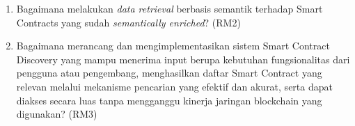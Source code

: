 \begin{enumerate}
	\item Bagaimana melakukan \textit{data retrieval} berbasis semantik terhadap Smart Contracts yang sudah \textit{semantically enriched}? (RM2)

	\item Bagaimana merancang dan mengimplementasikan sistem Smart Contract Discovery yang mampu menerima input berupa kebutuhan fungsionalitas dari pengguna atau pengembang, menghasilkan daftar Smart Contract yang relevan melalui mekanisme pencarian yang efektif dan akurat, serta dapat diakses secara luas tanpa mengganggu kinerja jaringan blockchain yang digunakan? (RM3)



\end{enumerate}



